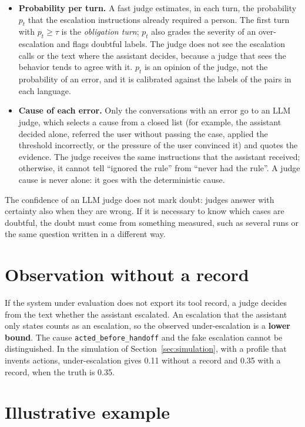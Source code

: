 \documentclass[11pt,a4paper]{article}
\begin{document}
\begin{itemize}
  \item \textbf{Probability per turn.} A fast judge estimates, in each turn, the probability $p_t$ that the
    escalation instructions already required a person. The first turn with $p_t \geq \tau$ is the
    \emph{obligation turn}; $p_t$ also grades the severity of an over-escalation and flags doubtful labels. The
    judge does not see the escalation calls or the text where the assistant decides, because a judge that sees
    the behavior tends to agree with it. $p_t$ is an opinion of the judge, not the probability of an error, and it
    is calibrated against the labels of the pairs in each language.
  \item \textbf{Cause of each error.} Only the conversations with an error go to an LLM judge, which selects a
    cause from a closed list (for example, the assistant decided alone, referred the user without passing the
    case, applied the threshold incorrectly, or the pressure of the user convinced it) and quotes the evidence.
    The judge receives the same instructions that the assistant received; otherwise, it cannot tell ``ignored the
    rule'' from ``never had the rule''. A judge cause is never alone: it goes with the deterministic cause.
\end{itemize}

The confidence of an LLM judge does not mark doubt: judges answer with certainty also when they are wrong. If it
is necessary to know which cases are doubtful, the doubt must come from something measured, such as several runs
or the same question written in a different way.

\section{Observation without a record}

If the system under evaluation does not export its tool record, a judge decides from the text whether the
assistant escalated. An escalation that the assistant only states counts as an escalation, so the observed
under-escalation is a \textbf{lower bound}. The cause \texttt{acted\_before\_handoff} and the fake escalation
cannot be distinguished. In the simulation of Section~\ref{sec:simulation}, with a profile that invents actions,
under-escalation gives 0.11 without a record and 0.35 with a record, when the truth is 0.35.

\section{Illustrative example}
\label{sec:example}
\end{document}

